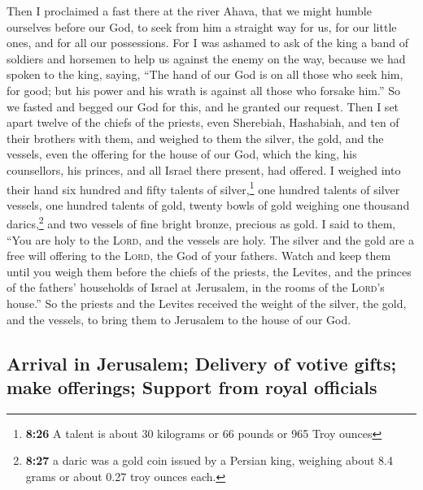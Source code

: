  Then I proclaimed a fast there at the river Ahava, that
we might humble ourselves before our God, to seek from him a straight
way for us, for our little ones, and for all our possessions.
 For I was ashamed to ask of the king a band of soldiers
and horsemen to help us against the enemy on the way, because we had
spoken to the king, saying, ``The hand of our God is on all those who
seek him, for good; but his power and his wrath is against all those who
forsake him.''  So we fasted and begged our God for this,
and he granted our request.  Then I set apart twelve of
the chiefs of the priests, even Sherebiah, Hashabiah, and ten of their
brothers with them,  and weighed to them the silver, the
gold, and the vessels, even the offering for the house of our God, which
the king, his counsellors, his princes, and all Israel there present,
had offered.  I weighed into their hand six hundred and
fifty talents of silver,\footnote{\textbf{8:26} A talent is about 30
  kilograms or 66 pounds or 965 Troy ounces} one hundred talents of
silver vessels, one hundred talents of gold,  twenty
bowls of gold weighing one thousand darics,\footnote{\textbf{8:27} a
  daric was a gold coin issued by a Persian king, weighing about 8.4
  grams or about 0.27 troy ounces each.} and two vessels of fine bright
bronze, precious as gold.  I said to them, ``You are holy
to the \textsc{Lord}, and the vessels are holy. The silver and the gold
are a free will offering to the \textsc{Lord}, the God of your fathers.
 Watch and keep them until you weigh them before the
chiefs of the priests, the Levites, and the princes of the fathers'
households of Israel at Jerusalem, in the rooms of the \textsc{Lord}'s
house.''  So the priests and the Levites received the
weight of the silver, the gold, and the vessels, to bring them to
Jerusalem to the house of our God.

\hypertarget{arrival-in-jerusalem-delivery-of-votive-gifts-make-offerings-support-from-royal-officials}{%
\subsection{Arrival in Jerusalem; Delivery of votive gifts; make
offerings; Support from royal
officials}\label{arrival-in-jerusalem-delivery-of-votive-gifts-make-offerings-support-from-royal-officials}}

